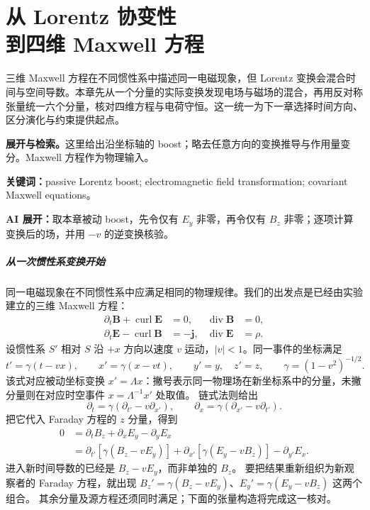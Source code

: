 \documentclass[UTF8,11pt,openany]{ctexbook}
\numberwithin{equation}{chapter}
\theoremstyle{definition}
\theoremstyle{remark}
\newcommand{\Div}{\operatorname{div}}
\newcommand{\curl}{\operatorname{curl}}
\newcommand{\studyroute}[3]{%
  \par\smallskip\noindent\textbf{展开与检索。}#1\par
  \noindent\textbf{关键词：}#2。\par
  \noindent\textbf{AI 展开：}#3\par
}
\begin{document}
\chapter[从 Lorentz 协变性到四维 Maxwell 方程]{从 Lorentz 协变性\\到四维 Maxwell 方程}
\label{ch:lorentz}
\begin{chaptersummary}
三维 Maxwell 方程在不同惯性系中描述同一电磁现象，但 Lorentz 变换会混合时间与空间导数。本章先从一个分量的实际变换发现电场与磁场的混合，再用反对称张量统一六个分量，核对四维方程与电荷守恒。这一统一为下一章选择时间方向、区分演化与约束提供起点。
\end{chaptersummary}
\studyroute{这里给出沿坐标轴的 boost；略去任意方向的变换推导与作用量变分。Maxwell 方程作为物理输入。}{passive Lorentz boost; electromagnetic field transformation; covariant Maxwell equations}{取本章被动 boost，先令仅有 $E_y$ 非零，再令仅有 $B_z$ 非零；逐项计算变换后的场，并用 $-v$ 的逆变换核验。}

\paragraph{从一次惯性系变换开始}
同一电磁现象在不同惯性系中应满足相同的物理规律。我们的出发点是已经由实验建立的三维 Maxwell 方程：
\begin{equation}\label{eq:maxwell3}
\begin{aligned}
\partial_t\bm B+\curl\bm E&=0,&\Div\bm B&=0,\\
\partial_t\bm E-\curl\bm B&=-\bm j,&\Div\bm E&=\rho.
\end{aligned}
\end{equation}
设惯性系 $S'$ 相对 $S$ 沿 $+x$ 方向以速度 $v$ 运动，$|v|<1$。同一事件的坐标满足
\[
t'=\gamma(t-vx),\qquad x'=\gamma(x-vt),\qquad
y'=y,\quad z'=z,\qquad \gamma=(1-v^2)^{-1/2}.
\]
该式对应被动坐标变换 $x'=\Lambda x$：撇号表示同一物理场在新坐标系中的分量，未撇分量则在对应时空事件 $x=\Lambda^{-1}x'$ 处取值。
链式法则给出
\[
\partial_t=\gamma(\partial_{t'}-v\partial_{x'}),\qquad
\partial_x=\gamma(\partial_{x'}-v\partial_{t'}).
\]
把它代入 Faraday 方程的 $z$ 分量，得到
\[
\begin{aligned}
0&=\partial_tB_z+\partial_xE_y-\partial_yE_x\\
 &=\partial_{t'}\!\left[\gamma(B_z-vE_y)\right]
  +\partial_{x'}\!\left[\gamma(E_y-vB_z)\right]-\partial_{y'}E_x.
\end{aligned}
\]
进入新时间导数的已经是 $B_z-vE_y$，而非单独的 $B_z$。
要把结果重新组织为新观察者的 Faraday 方程，就出现
$B_z'=\gamma(B_z-vE_y)$、$E_y'=\gamma(E_y-vB_z)$ 这两个组合。
其余分量及源方程还须同时满足；下面的张量构造将完成这一核对。
\end{document}
